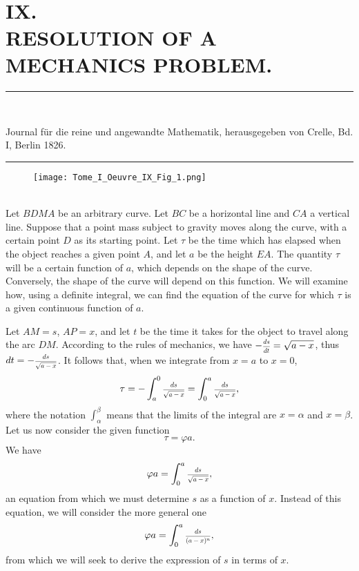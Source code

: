 \documentclass[oneside, 12 pt, leqno]{memoir}
\let\oldfrac\frac
\def\frac#1#2{\mathchoice{\text{\scalebox{.83}{${\oldfrac{#1}{#2}}$}}}{\text{\scalebox{.83}{${\displaystyle\oldfrac{#1}{#2}}$}}}{\genfrac{}{}{}{2}{#1}{#2}}{\genfrac{}{}{}{3}{#1}{#2}}}
\begin{document}
\setlength{\abovedisplayskip}{0.33\baselineskip plus .16\baselineskip minus .16\baselineskip}
\setlength{\belowdisplayskip}{0.33\baselineskip plus .16\baselineskip minus .16\baselineskip}

\;\\ [3\baselineskip]
\section*{{\Large IX.} \\ [\baselineskip]
RESOLUTION OF A MECHANICS PROBLEM.}
\begin{center}
\rule{2in}{0.1pt}\\ [0.5\baselineskip]
\begin{scriptsize} Journal für die reine und angewandte Mathematik, herausgegeben von Crelle, Bd. I, Berlin 1826. \par\end{scriptsize}
\rule{2in}{0.1pt}
\end{center}

\begin{wrapfigure}{r}[0\baselineskip]{6\baselineskip}\texttt{[image: Tome\_I\_Oeuvre\_IX\_Fig\_1.png]} \end{wrapfigure} \;\\[-0.5\baselineskip]

Let \(BDMA\) be an arbitrary curve. Let \(BC\) be a horizontal line and \(CA\) a vertical line. Suppose that a point mass subject to gravity moves along the curve, with a certain point \(D\) as its starting point. Let \(\tau\) be the time which has elapsed when the object reaches a given point \(A\), and let \(a\) be the height \(EA\). The quantity \(\tau\) will be a certain function of \(a\), which depends on the shape of the curve. Conversely, the shape of the curve will depend on this function. We will examine how, using a definite integral, we can find the equation of the curve for which \(\tau\) is a given continuous function of \(a\).

Let \(A M=s\), \(A P=x\), and let \(t\) be the time it takes for the object to travel along the arc \(D M\). According to the rules of mechanics, we have \(-\frac{d s}{d t}=\sqrt{a-x}\), thus \(d t=-\frac{d s}{\sqrt{a-x}}\). It follows that, when we integrate from \(x=a\) to \(x=0\),
\[\tau=-\int_a^0 \frac{d s}{\sqrt{a-x}}=\int_0^a \frac{d s}{\sqrt{a-x}},\]
where the notation \(\int_\alpha^\beta\) means that the limits of the integral are \(x=\alpha\) and \(x=\beta\). Let us now consider the given function
\[\tau=\varphi a.\]
We have
\[\varphi a=\int_0^a \frac{d s}{\sqrt{a-x}},\]
an equation from which we must determine \(s\) as a function of \(x\). Instead of this equation, we will consider the more general one
\[\varphi a=\int_0^a \frac{d s}{(a-x)^n},\]
from which we will seek to derive the expression of \(s\) in terms of \(x\).
\end{document}
